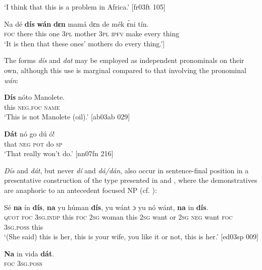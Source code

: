 \glt ‘I think that this is a problem in Africa.’ [fr03ft 105]
\z


\ea%
    \label{ex:key:195}
    \gll Na  dé    \textbf{dís}  \textbf{wán}    \textbf{dɛn}  mamá  dɛn  de  mék    ɛ́ni    tín.\\
\textsc{foc}  there  this  one    \textsc{3pl}  mother  \textsc{3pl}  \textsc{ipfv}  make  every  thing\\

\glt ‘It is then that these ones’ mothers do every thing.’\textstylePichiglossZchn{ [ab03ay 047}]
\z

The forms \textit{dís} and \textit{dat} may be employed as independent pronominals on their own, although this use is marginal compared to that involving the pronominal \textit{wán}:


\ea%
    \label{ex:key:196}
    \gll \textbf{Dís}  nóto  Manolete.\\
this  \textsc{neg}.\textsc{foc}  \textsc{name}\\
\glt ‘This is not Manolete (oil).’ [ab03ab 029]\\
\z

\ea%
    \label{ex:key:197}
    \gll \textbf{Dát} nó  go  dú  ó!\\
that  \textsc{neg}  \textsc{pot}  do  \textsc{sp}\\

\glt ‘That really won’t do.’ [nn07fn 216]
\z

\textit{Dís} and \textit{dát}, but never \textit{dí} and \textit{dá/dán}, also occur in sentence-final position in a presentative construction of the type presented in  and , where the demonstratives are anaphoric to an antecedent focused NP (cf. )\textsc{:} 


\ea%
    \label{ex:key:198}
    \gll Sé    \textbf{na} ín    \textbf{dís},  \textbf{na} yu  húman  \textbf{dís},  yu  wánt
ɔ  yu  nó  wánt,  \textbf{na} in    \textbf{dís}. \\
\textsc{quot}    \textsc{foc}  \textsc{3sg.indp}  this  \textsc{foc}  \textsc{2sg}  woman  this  \textsc{2sg}  want
or  \textsc{2sg}  \textsc{neg}  want  \textsc{foc}  \textsc{3sg.poss}  this \\

\glt ‘(She said) this is her, this is your wife, you like it or not, 
this is her.’ [ed03sp 009]
\z


\ea%
    \label{ex:key:199}
    \gll \textbf{Na} in    vida    \textbf{dát}.\\
\textsc{foc}\textstylePichiexamplenumberZchnZchn{} \textsc{3sg.poss}     \\

